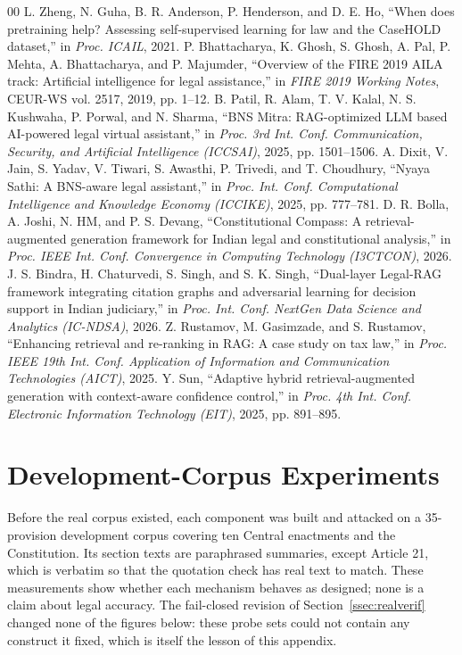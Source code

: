 \documentclass[conference]{IEEEtran}
\begin{document}
\begin{thebibliography}{00}
 L. Zheng, N. Guha, B. R. Anderson, P. Henderson, and D. E. Ho, ``When does pretraining help? Assessing self-supervised learning for law and the CaseHOLD dataset,'' in \textit{Proc. ICAIL}, 2021.
 P. Bhattacharya, K. Ghosh, S. Ghosh, A. Pal, P. Mehta, A. Bhattacharya, and P. Majumder, ``Overview of the FIRE 2019 AILA track: Artificial intelligence for legal assistance,'' in \textit{FIRE 2019 Working Notes}, CEUR-WS vol. 2517, 2019, pp. 1--12.
 B. Patil, R. Alam, T. V. Kalal, N. S. Kushwaha, P. Porwal, and N. Sharma, ``BNS Mitra: RAG-optimized LLM based AI-powered legal virtual assistant,'' in \textit{Proc. 3rd Int. Conf. Communication, Security, and Artificial Intelligence (ICCSAI)}, 2025, pp. 1501--1506.
 A. Dixit, V. Jain, S. Yadav, V. Tiwari, S. Awasthi, P. Trivedi, and T. Choudhury, ``Nyaya Sathi: A BNS-aware legal assistant,'' in \textit{Proc. Int. Conf. Computational Intelligence and Knowledge Economy (ICCIKE)}, 2025, pp. 777--781.
 D. R. Bolla, A. Joshi, N. HM, and P. S. Devang, ``Constitutional Compass: A retrieval-augmented generation framework for Indian legal and constitutional analysis,'' in \textit{Proc. IEEE Int. Conf. Convergence in Computing Technology (I3CTCON)}, 2026.
 J. S. Bindra, H. Chaturvedi, S. Singh, and S. K. Singh, ``Dual-layer Legal-RAG framework integrating citation graphs and adversarial learning for decision support in Indian judiciary,'' in \textit{Proc. Int. Conf. NextGen Data Science and Analytics (IC-NDSA)}, 2026.
 Z. Rustamov, M. Gasimzade, and S. Rustamov, ``Enhancing retrieval and re-ranking in RAG: A case study on tax law,'' in \textit{Proc. IEEE 19th Int. Conf. Application of Information and Communication Technologies (AICT)}, 2025.
 Y. Sun, ``Adaptive hybrid retrieval-augmented generation with context-aware confidence control,'' in \textit{Proc. 4th Int. Conf. Electronic Information Technology (EIT)}, 2025, pp. 891--895.
\end{thebibliography}

\appendices

\section{Development-Corpus Experiments}
\label{app:dev}

Before the real corpus existed, each component was built and attacked on a 35-provision development corpus covering ten Central enactments and the Constitution. Its section texts are paraphrased summaries, except Article 21, which is verbatim so that the quotation check has real text to match. These measurements show whether each mechanism behaves as designed; none is a claim about legal accuracy. The fail-closed revision of Section~\ref{ssec:realverif} changed none of the figures below: these probe sets could not contain any construct it fixed, which is itself the lesson of this appendix.
\end{document}
